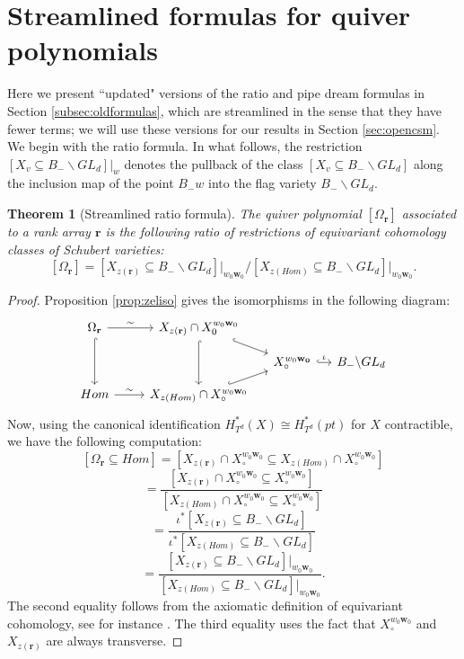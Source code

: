 \documentclass[reqno]{amsart}
\numberwithin{equation}{section}
\newtheorem{theorem}{Theorem}[section]
\theoremstyle{definition}
\theoremstyle{remark}
\begin{document}
\section{Streamlined formulas for quiver polynomials}\label{sec:polys}
Here we present ``updated" versions of the ratio and pipe dream formulas in Section \ref{subsec:oldformulas}, which are streamlined in the sense that they have fewer terms; we will use these versions for our results in Section \ref{sec:opencsm}. We begin with the ratio formula. In what follows, the restriction $[X_v\subseteq B_- \backslash GL_d]\Big|_w$ denotes the pullback of the class $[X_v\subseteq B_- \backslash GL_d]$ along the inclusion map of the point $B_-w$ into the flag variety $B_- \backslash GL_d$.
\begin{theorem}[Streamlined ratio formula]\label{thm:newratio}
The quiver polynomial $[\Omega_{\mathbf{r}}]$ associated to a rank array $\mathbf{r}$ is the following ratio of restrictions of equivariant cohomology classes of Schubert varieties:
\[[\Omega_{\mathbf{r}}]=[X_{z(\mathbf{r})} \subseteq B_- \backslash GL_d]\Big|_{w_0\mathbf{w}_0} \Big/ [X_{z(Hom)}\subseteq B_- \backslash GL_d]\Big|_{w_0\mathbf{w}_0}.\]
\end{theorem}
\begin{proof}
Proposition \ref{prop:zeliso} gives the isomorphisms in the following diagram:
\[\begin{tikzcd}[sep=small]
	{\Omega_{\mathbf{r}}} && {X_{z(\mathbf{r})} \cap X_0^{w_0\mathbf{w}_0}} \\
	&&& {X_\circ^{w_0\mathbf{w_0}}} & {B_- \backslash GL_d} \\
	Hom && {X_{z(Hom)} \cap X_\circ^{w_0\mathbf{w}_0}}
	\arrow["\sim", from=1-1, to=1-3]
	\arrow[hook, from=1-1, to=3-1]
	\arrow[hook, from=1-3, to=2-4]
	\arrow[hook, from=1-3, to=3-3]
	\arrow[hook,"\iota", from=2-4, to=2-5]
	\arrow["\sim", from=3-1, to=3-3]
	\arrow[hook, from=3-3, to=2-4]
\end{tikzcd}\]
Now, using the canonical identification $H^*_{T^d}(X) \cong H^*_{T^d}(pt)$ for $X$ contractible, we have the following computation:
\[[\Omega_{\mathbf{r}} \subseteq Hom]=[X_{z(\mathbf{r})} \cap X_\circ^{w_0\mathbf{w}_0} \subseteq X_{z(Hom)} \cap X_\circ^{w_0\mathbf{w}_0}]\]
\[=\frac{[X_{z(\mathbf{r})} \cap X_\circ^{w_0\mathbf{w}_0} \subseteq X_\circ^{w_0\mathbf{w}_0}]}{[X_{z(Hom)} \cap X_\circ^{w_0\mathbf{w}_0} \subseteq X_\circ^{w_0\mathbf{w}_0}]}\]
\[=\frac{\iota^*[X_{z(\mathbf{r})} \subseteq B_- \backslash GL_d]}{\iota^*[X_{z(Hom)}  \subseteq B_- \backslash GL_d]}\]
\[=\frac{[X_{z(\mathbf{r})}\subseteq B_- \backslash GL_d]\Big|_{w_0\mathbf{w}_0}}{[X_{z(Hom)}  \subseteq B_- \backslash GL_d]\Big|_{w_0\mathbf{w}_0}}.\] 
The second equality follows from the axiomatic definition of equivariant cohomology, see for instance \cite[Sec. 1.3]{KZJ07}. The third equality uses the fact that $X_\circ^{w_0\mathbf{w}_0}$ and $X_{z(\mathbf{r})}$ are always transverse.
\end{proof}
\end{document}
